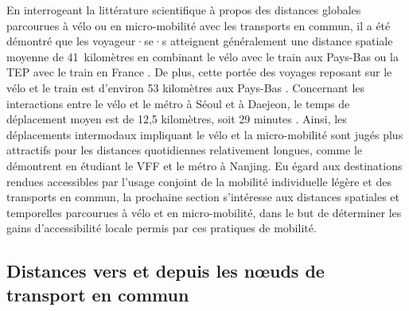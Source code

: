 \begin{refsegment}
En interrogeant la littérature scientifique à propos des distances globales parcourues à vélo ou en micro-mobilité avec les transports en commun, il a été démontré que les voyageur·se·s atteignent généralement une distance spatiale moyenne de 41~kilomètres en combinant le vélo avec le train aux Pays-Bas \textcolor{blue}{\autocite[14]{shelat_analysing_2018}} ou la \acrshort{TEP} avec le train en France \textcolor{blue}{\autocite[186]{moinse_intermodal_2022}}. De plus, cette portée des voyages reposant sur le vélo et le train est d'environ 53 kilomètres aux Pays-Bas \textcolor{blue}{\autocite[225]{keijer_how_2000}}. Concernant les interactions entre le vélo et le métro à Séoul et à Daejeon, le temps de déplacement moyen est de 12,5 kilomètres, soit 29 minutes \textcolor{blue}{\autocite[46]{lee_strategies_2010}}. Ainsi, les déplacements intermodaux impliquant le vélo et la micro-mobilité sont jugés plus attractifs pour les distances quotidiennes relativement longues, comme le démontrent \textcolor{blue}{\textcite[9]{liu_use_2020}} en étudiant le \acrshort{VFF} et le métro à Nanjing. Eu égard aux destinations rendues accessibles par l'usage conjoint de la mobilité individuelle légère et des transports en commun, la prochaine section s'intéresse aux distances spatiales et temporelles parcourues à vélo et en micro-mobilité, dans le but de déterminer les gains d'accessibilité locale permis par ces pratiques de mobilité.%

\subsection{Distances vers et depuis les nœuds de transport en commun
    \label{chap2:distances-premiers-derniers-km}
    }
    

\end{refsegment}
